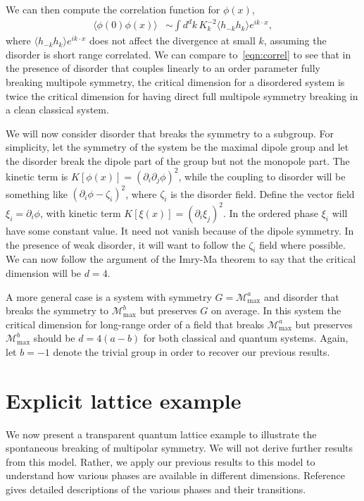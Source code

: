 \documentclass[prb,aps,twocolumn, amsfonts,amsmath,amssymb,nofootinbib,superscriptaddress]{revtex4-2}
\renewcommand{\max}{\text{max}}
\newcommand{\mmax}[1]{\mathcal{M}^{#1}_\max}
\begin{document}
We can then compute the correlation function for $\phi(x)$,
\begin{align}
\langle \phi(0) \phi(x) \rangle &\sim \int d^dk \, K_k^{-2} \langle h_{-k} h_{k} \rangle e^{ik\cdot x},
\end{align}
where $\langle h_{-k} h_{k} \rangle e^{ik\cdot x}$ does not affect the divergence at small $k$, assuming the disorder is short range correlated. We can compare to~\eqref{eqn:correl} to see that in the presence of disorder that couples linearly to an order parameter fully breaking multipole symmetry, the critical dimension for a disordered system is twice the critical dimension for having direct full multipole symmetry breaking in a clean classical system.

We will now consider disorder that breaks the symmetry to a subgroup. For simplicity, let the symmetry of the system be the maximal dipole group and let the disorder break the dipole part of the group but not the monopole part. The kinetic term is $K[\phi(x)]= (\partial_i \partial_j \phi)^2$, while the coupling to disorder will be something like $(\partial_i\phi - \zeta_i)^2$, where $\zeta_i$ is the disorder field. 
Define the vector field $\xi_i = \partial_i\phi$, with kinetic term $K[\xi(x)]= (\partial_i \xi_j)^2$. In the ordered phase $\xi_i$ will have some constant value. It need not vanish because of the dipole symmetry. In the presence of weak disorder, it will want to follow the $\zeta_i$ field where possible. We can now follow the argument of the Imry-Ma theorem to say that the critical dimension will be $d=4$.

A more general case is a system with symmetry $G = \mathcal{M}_\max^a$ and disorder that breaks the symmetry to $\mathcal{M}_\max^b$ but preserves $G$ on average. In this system the critical dimension for long-range order of a field that breaks $\mmax{a}$ but preserves $\mmax{b}$ should be $d=4(a-b)$ for both classical and quantum systems. Again, let $b=-1$ denote the trivial group in order to recover our previous results.

\section{Explicit lattice example} \label{sec:example}

We now present a transparent quantum lattice example to illustrate the spontaneous breaking of multipolar symmetry. We will not derive further results from this model. Rather, we apply our previous results to this model to understand how various phases are available in different dimensions. Reference~\cite{dbhm} gives detailed descriptions of the various phases and their transitions.
\end{document}
